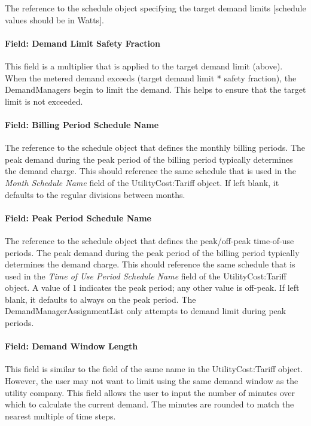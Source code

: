 The reference to the schedule object specifying the target demand limits {[}schedule values should be in Watts{]}.

\paragraph{Field: Demand Limit Safety Fraction}\label{field-demand-limit-safety-fraction}

This field is a multiplier that is applied to the target demand limit (above). When the metered demand exceeds (target demand limit * safety fraction), the DemandManagers begin to limit the demand. This helps to ensure that the target limit is not exceeded.

\paragraph{Field: Billing Period Schedule Name}\label{field-billing-period-schedule-name}

The reference to the schedule object that defines the monthly billing periods. The peak demand during the peak period of the billing period typically determines the demand charge. This should reference the same schedule that is used in the \emph{Month Schedule Name} field of the UtilityCost:Tariff object. If left blank, it defaults to the regular divisions between months.

\paragraph{Field: Peak Period Schedule Name}\label{field-peak-period-schedule-name}

The reference to the schedule object that defines the peak/off-peak time-of-use periods. The peak demand during the peak period of the billing period typically determines the demand charge. This should reference the same schedule that is used in the \emph{Time of Use Period Schedule Name} field of the UtilityCost:Tariff object. A value of 1 indicates the peak period; any other value is off-peak. If left blank, it defaults to always on the peak period. The DemandManagerAssignmentList only attempts to demand limit during peak periods.

\paragraph{Field: Demand Window Length}\label{field-demand-window-length}

This field is similar to the field of the same name in the UtilityCost:Tariff object. However, the user may not want to limit using the same demand window as the utility company. This field allows the user to input the number of minutes over which to calculate the current demand. The minutes are rounded to match the nearest multiple of time steps.

